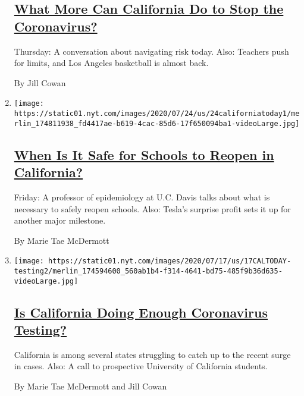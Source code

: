 \begin{enumerate}
  \hypertarget{what-more-can-california-do-to-stop-the-coronavirus}{%
  \subsection{\texorpdfstring{\href{/2020/07/30/us/coronavirus-california-health-equity.html}{What
  More Can California Do to Stop the
  Coronavirus?}}{What More Can California Do to Stop the Coronavirus?}}\label{what-more-can-california-do-to-stop-the-coronavirus}}

  Thursday: A conversation about navigating risk today. Also: Teachers
  push for limits, and Los Angeles basketball is almost back.

  By Jill Cowan
\item
  \texttt{[image: https://static01.nyt.com/images/2020/07/24/us/24californiatoday1/merlin\_174811938\_fd4417ae-b619-4cac-85d6-17f650094ba1-videoLarge.jpg]}

  \hypertarget{when-is-it-safe-for-schools-to-reopen-in-california}{%
  \subsection{\texorpdfstring{\href{/2020/07/24/us/ca-schools-reopening.html}{When
  Is It Safe for Schools to Reopen in
  California?}}{When Is It Safe for Schools to Reopen in California?}}\label{when-is-it-safe-for-schools-to-reopen-in-california}}

  Friday: A professor of epidemiology at U.C. Davis talks about what is
  necessary to safely reopen schools. Also: Tesla's surprise profit sets
  it up for another major milestone.

  By Marie Tae McDermott
\item
  \texttt{[image: https://static01.nyt.com/images/2020/07/17/us/17CALTODAY-testing2/merlin\_174594600\_560ab1b4-f314-4641-bd75-485f9b36d635-videoLarge.jpg]}

  \hypertarget{is-california-doing-enough-coronavirus-testing}{%
  \subsection{\texorpdfstring{\href{/2020/07/17/us/ca-coronavirus-covid-testing.html}{Is
  California Doing Enough Coronavirus
  Testing?}}{Is California Doing Enough Coronavirus Testing?}}\label{is-california-doing-enough-coronavirus-testing}}

  California is among several states struggling to catch up to the
  recent surge in cases. Also: A call to prospective University of
  California students.

  By Marie Tae McDermott and Jill Cowan
\end{enumerate}

